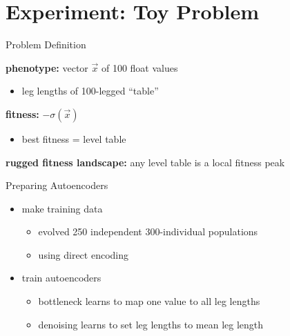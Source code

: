 \section{Experiment: Toy Problem}

\begin{frame}{Problem Definition}

\textbf{phenotype:} vector $\vec{x}$ of 100 float values
\begin{itemize}
\item leg lengths of 100-legged ``table''
\end{itemize}

\vspace{2ex}
\pause

\textbf{fitness:} $-\sigma(\vec{x})$
\begin{itemize}
\item best fitness = level table
\end{itemize}

\vspace{2ex}
\pause

\textbf{rugged fitness landscape:}
any level table is a local fitness peak

\end{frame}

\begin{frame}{Preparing Autoencoders}

\Large

\begin{itemize}[<+->]
\item make training data
\pause
\begin{itemize}[<+->]
\item evolved 250 independent 300-individual populations
\item using direct encoding
\end{itemize}
\vspace{1ex}
\item train autoencoders
\pause
\begin{itemize}[<+->]
\item bottleneck learns to map one value to all leg lengths
\item denoising learns to set leg lengths to mean leg length
\end{itemize}
\end{itemize}

\end{frame}

